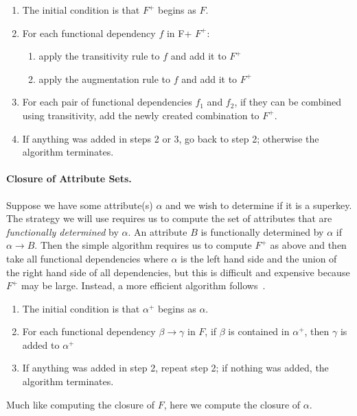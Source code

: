 \documentclass[a4paper]{report}
\begin{document}
\begin{enumerate}
	\item The initial condition is that $F^{+}$ begins as $F$.
	\item For each functional dependency $f$ in F+ $F^{+}$:
	\begin{enumerate}
		\item apply the transitivity rule to $f$ and add it to $F^{+}$
		\item apply the augmentation rule to $f$ and add it to $F^{+}$
	\end{enumerate}
	\item For each pair of functional dependencies $f_{1}$ and $f_{2}$, if they can be combined using transitivity, add the newly created combination to $F^{+}$.
	\item If anything was added in steps 2 or 3, go back to step 2; otherwise the algorithm terminates.
\end{enumerate}

\paragraph{Closure of Attribute Sets.} Suppose we have some attribute(s) $\alpha$ and we wish to determine if it is a superkey. The strategy we will use requires us to compute the set of attributes that are \textit{functionally determined} by $\alpha$. An attribute $B$ is functionally determined by $\alpha$ if $\alpha \rightarrow B$. Then the  simple algorithm requires us to compute $F^{+}$ as above and then take all functional dependencies where $\alpha$ is the left hand side and the union of the right hand side of all dependencies, but this is difficult and expensive because $F^{+}$ may be large. Instead, a more efficient algorithm follows~\cite{dsc}.

\begin{enumerate}
	\item The initial condition is that $\alpha^{+}$ begins as $\alpha$.
	\item For each functional dependency $\beta \rightarrow \gamma$ in $F$,
		if $\beta$ is contained in $\alpha^{+}$, then $\gamma$ is added to $\alpha^{+}$
	\item If anything was added in step 2, repeat step 2; if nothing was added, the algorithm terminates.
\end{enumerate}

Much like computing the closure of $F$, here we compute the closure of $\alpha$. 
\end{document}

